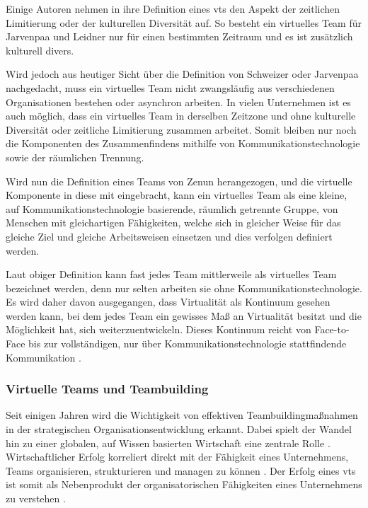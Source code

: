 \documentclass[a4paper,11pt]{article}%
\renewcommand{\\}{\vspace*{0.5\baselineskip} \newline}
\begin{document}
Einige Autoren nehmen in ihre Definition eines \ac{vts} den Aspekt der zeitlichen Limitierung oder der kulturellen Diversität auf. So besteht ein virtuelles Team für Jarvenpaa und Leidner\citep[p.1-2]{jarvenpaa1999communication} nur für einen bestimmten Zeitraum und es ist zusätzlich kulturell divers. 

Wird jedoch aus heutiger Sicht über die Definition von Schweizer oder Jarvenpaa nachgedacht, muss ein virtuelles Team nicht zwangsläufig aus verschiedenen Organisationen bestehen oder asynchron arbeiten. In vielen Unternehmen ist es auch möglich, dass ein virtuelles Team in derselben Zeitzone und ohne kulturelle Diversität oder zeitliche Limitierung zusammen arbeitet.
Somit bleiben nur noch die Komponenten des Zusammenfindens mithilfe von Kommunikationstechnologie sowie der räumlichen Trennung.

Wird nun die Definition eines Teams von Zenun \citep[p.2]{zenun2007effects} herangezogen, und die virtuelle Komponente in diese mit eingebracht, kann ein virtuelles Team als \\
\dq{}eine kleine, auf Kommunikationstechnologie basierende, räumlich getrennte Gruppe, von Menschen mit gleichartigen Fähigkeiten, welche sich in gleicher Weise für das gleiche Ziel und gleiche Arbeitsweisen einsetzen und dies verfolgen\dq{} \\
definiert werden.

Laut obiger Definition kann fast jedes Team mittlerweile als virtuelles Team bezeichnet werden, denn nur selten arbeiten sie ohne Kommunikationstechnologie. Es wird daher davon ausgegangen, dass Virtualität als Kontinuum gesehen werden kann, bei dem jedes Team ein gewisses Maß an Virtualität besitzt und die Möglichkeit hat, sich weiterzuentwickeln. Dieses Kontinuum reicht von Face-to-Face bis zur vollständigen, nur über Kommunikationstechnologie stattfindende Kommunikation \citep{martins2004virtual}.
\subsubsection{Virtuelle Teams und Teambuilding}

Seit einigen Jahren wird die Wichtigkeit von effektiven Teambuildingmaßnahmen in der strategischen Organisationsentwicklung erkannt. Dabei spielt der Wandel hin zu einer globalen, auf Wissen basierten Wirtschaft eine zentrale Rolle \citep{belbin2011management} \citep[p.7]{katzenbach2015wisdom}.
Wirtschaftlicher Erfolg korreliert direkt mit der Fähigkeit eines Unternehmens, Teams organisieren, strukturieren und managen zu können \citep{pasmore1993designing}.
Der Erfolg eines \ac{vts} ist somit als Nebenprodukt der organisatorischen Fähigkeiten eines Unternehmens zu verstehen \citep[p.5]{kling1994social}.
\end{document}
